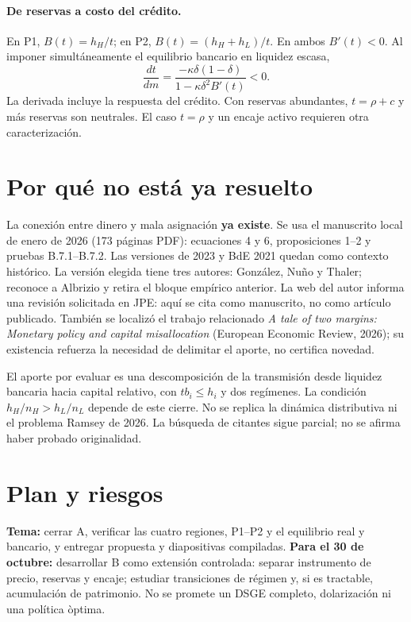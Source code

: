 \documentclass[11pt]{article}
\begin{document}
\paragraph{De reservas a costo del cr\'edito.}
En P1, $B(t)=h_H/t$; en P2, $B(t)=(h_H+h_L)/t$. En ambos $B'(t)<0$.
Al imponer simult\'aneamente el equilibrio bancario en liquidez escasa,
\[
 \frac{dt}{dm}=\frac{-\kappa\delta(1-\delta)}{1-\kappa\delta^2B'(t)}<0.
\]
La derivada incluye la respuesta del cr\'edito. Con reservas abundantes,
$t=\rho+c$ y m\'as reservas son neutrales. El caso $t=\rho$ y un encaje
activo requieren otra caracterizaci\'on.

\newpage
\section{Por qu\'e no est\'a ya resuelto}
La conexi\'on entre dinero y mala asignaci\'on \textbf{ya existe}. Se usa el
manuscrito local de enero de 2026 (173 p\'aginas PDF): ecuaciones 4 y 6,
proposiciones 1--2 y pruebas B.7.1--B.7.2. Las versiones de 2023 y BdE 2021
quedan como contexto hist\'orico. La versi\'on elegida tiene tres autores:
Gonz\'alez, Nu\~no y Thaler; reconoce a Albrizio y retira el bloque
emp\'irico anterior. La web del autor informa una revisi\'on
solicitada en JPE: aqu\'i se cita como manuscrito, no como art\'iculo publicado.
Tambi\'en se localiz\'o el trabajo relacionado \emph{A tale of two margins:
Monetary policy and capital misallocation} (European Economic Review, 2026);
su existencia refuerza la necesidad de delimitar el aporte, no certifica novedad.

El aporte por evaluar es una descomposici\'on de la transmisi\'on desde liquidez
bancaria hacia capital relativo, con $tb_i\leq h_i$ y dos reg\'imenes. La
condici\'on $h_H/n_H>h_L/n_L$ depende de este cierre. No se replica la
din\'amica distributiva ni el problema Ramsey de 2026. La b\'usqueda de citantes
sigue parcial; no se afirma haber probado originalidad.

\section{Plan y riesgos}
\textbf{Tema:} cerrar A, verificar las cuatro regiones, P1--P2 y el equilibrio
real y bancario, y entregar propuesta y diapositivas compiladas.
\textbf{Para el 30 de octubre:} desarrollar B como extensi\'on controlada:
separar instrumento de precio, reservas y encaje; estudiar transiciones de
r\'egimen y, si es tractable, acumulaci\'on de patrimonio. No se promete un
DSGE completo, dolarizaci\'on ni una pol\'itica \`optima.
\end{document}
